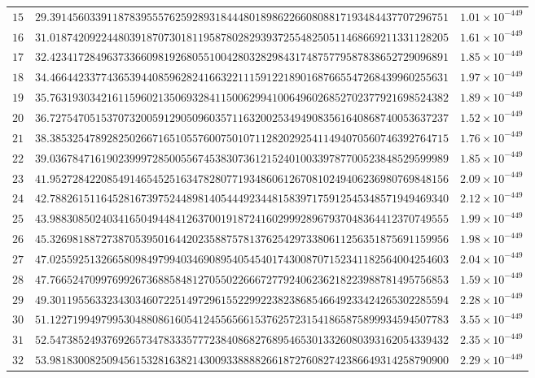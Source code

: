 \documentclass[12pt,reqno]{amsart}
\theoremstyle{remark}
\begin{document}
\begin{longtable}{clc}
$15$ & $29.3914560339118783955576259289318444801898622660808817193484437707296751$ & $1.01\times 10^{-449}$ \\
$16$ & $31.0187420922448039187073018119587802829393725548250511468669211331128205$ & $1.61\times 10^{-449}$ \\
$17$ & $32.4234172849637336609819268055100428032829843174875779587838652729096891$ & $1.85\times 10^{-449}$ \\
$18$ & $34.4664423377436539440859628241663221115912218901687665547268439960255631$ & $1.97\times 10^{-449}$ \\
$19$ & $35.7631930342161159602135069328411500629941006496026852702377921698524382$ & $1.89\times 10^{-449}$ \\
$20$ & $36.7275470515370732005912905096035711632002534949083561640868740053637237$ & $1.52\times 10^{-449}$ \\
$21$ & $38.3853254789282502667165105576007501071128202925411494070560746392764715$ & $1.76\times 10^{-449}$ \\
$22$ & $39.0367847161902399972850055674538307361215240100339787700523848529599989$ & $1.85\times 10^{-449}$ \\
$23$ & $41.9527284220854914654525163478280771934860612670810249406236980769848156$ & $2.09\times 10^{-449}$ \\
$24$ & $42.7882615116452816739752448981405444923448158397175912545348571949469340$ & $2.12\times 10^{-449}$ \\
$25$ & $43.9883085024034165049448412637001918724160299928967937048364412370749555$ & $1.99\times 10^{-449}$ \\
$26$ & $45.3269818872738705395016442023588757813762542973380611256351875691159956$ & $1.98\times 10^{-449}$ \\
$27$ & $47.0255925132665809849799403469089540545401743008707152341182564004254603$ & $2.04\times 10^{-449}$ \\
$28$ & $47.7665247099769926736885848127055022666727792406236218223988781495756853$ & $1.59\times 10^{-449}$ \\
$29$ & $49.3011955633234303460722514972961552299223823868546649233424265302285594$ & $2.28\times 10^{-449}$ \\
$30$ & $51.1227199497995304880861605412455656615376257231541865875899934594507783$ & $3.55\times 10^{-449}$ \\
$31$ & $52.5473852493769265734783335777238408682768954653013326080393162054339432$ & $2.35\times 10^{-449}$ \\
$32$ & $53.9818300825094561532816382143009338888266187276082742386649314258790900$ & $2.29\times 10^{-449}$ \\

\end{longtable}
\end{document}
